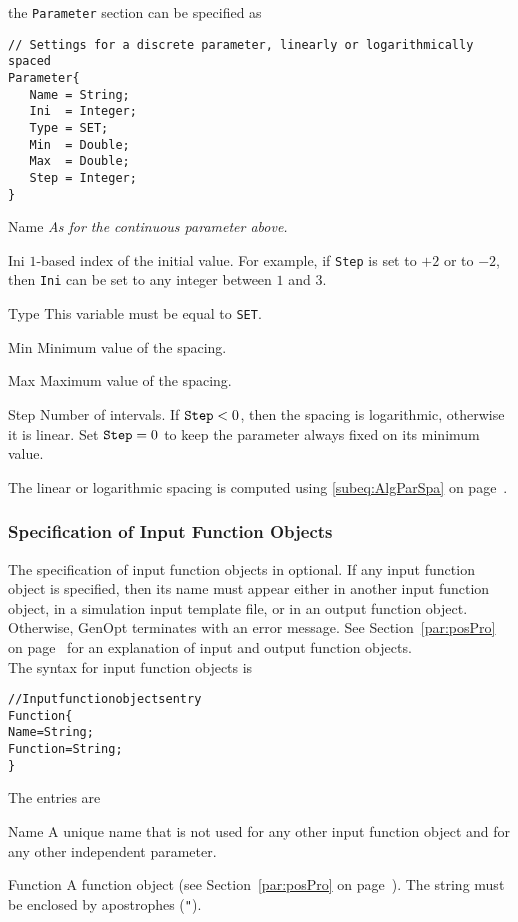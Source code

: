 the \texttt{Parameter} section can be specified as
\begin{lstlisting}
// Settings for a discrete parameter, linearly or logarithmically spaced
Parameter{
   Name = String;
   Ini  = Integer;
   Type = SET;
   Min  = Double;
   Max  = Double;
   Step = Integer;
}
\end{lstlisting}
\begin{codedescription}
  \item [Name] {\it As for the continuous parameter above.}

\item [Ini] $1$-based index of the initial value. For example, if \verb$Step$ is set to $+2$ or to $-2$, then \verb$Ini$ can be set to any integer between $1$ and $3$.

\item [Type] This variable must be equal to \verb$SET$.

\item [Min] Minimum value of the spacing.

\item [Max] Maximum value of the spacing.

\item [Step] Number of intervals. If $\text{\texttt{Step}} < 0$, then the spacing is logarithmic, otherwise it is linear. Set $\text{\texttt{Step}} = 0$ to keep the parameter always fixed on its minimum value.
\end{codedescription}
The linear or logarithmic spacing is computed using \eqref{subeq:AlgParSpa} on page~\pageref{subeq:AlgParSpa}.\\


\subsubsection{Specification of Input Function Objects}
\label{subsubsec:InpFunObj}
The specification of input function objects in optional.
If any input function object is specified, then its name
must appear either in another input function object, in
a simulation input template file, or in
an output function object.
Otherwise, GenOpt terminates with an error message.
See Section~\ref{par:posPro} on page~\pageref{par:posPro} for an explanation of input and output function
objects.\\

The syntax for input function objects is
\begin{alltt}
// Input function objects entry
Function\{
   Name     = String;
   Function = String;
\}
\end{alltt}
The entries are
\begin{codedescription}
\item [Name] A unique name that is not used for any other input function object
and for any other independent parameter.
\item [Function] A function object (see Section~\ref{par:posPro} on page~\pageref{par:posPro}).
The string must be enclosed by apostrophes (\texttt{"}).
\end{codedescription}

